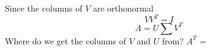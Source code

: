 \markdownRendererInterblockSeparator
{}Since the columns of $V$ are orthonormal\markdownRendererEllipsis{}\markdownRendererInterblockSeparator
{}$$VV^T=I$$\markdownRendererInterblockSeparator
{}$$A = U\sum V^T$$\markdownRendererInterblockSeparator
{}Where do we get the columns of $V$ and $U$ from?\markdownRendererInterblockSeparator
{}$A^T$ =\relax